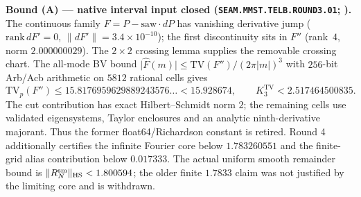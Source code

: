 \documentclass[11pt,a4paper]{article}
\begin{document}
\par\smallskip\noindent\textbf{Bound (A) --- native interval input closed
(\texttt{SEAM.MMST.TELB.ROUND3.01};
).}
The continuous family $F=P-\mathrm{saw}\cdot dP$ has vanishing derivative jump
($\mathrm{rank}\,dF'=0$, $\lVert dF'\rVert=3.4{\times}10^{-10}$); the first
discontinuity sits in $F''$ (rank~$4$, norm $2.000000029$).  The $2{\times}2$
crossing lemma supplies the removable crossing chart.  The all-mode BV bound
$\lvert\hat F(m)\rvert\le\mathrm{TV}(F'')/(2\pi\lvert m\rvert)^3$ with
$256$-bit Arb/Acb arithmetic on $5812$ rational cells gives
\[
 \mathrm{TV}_p(F'')\le15.8176959629889243576\ldots<15.928674,
 \qquad K_3^{\mathrm{TV}}<2.517464500835.
\]
The cut contribution has exact Hilbert--Schmidt norm $2$; the remaining cells use
validated eigensystems, Taylor enclosures and an analytic ninth-derivative majorant.
Thus the former float64/Richardson constant is retired. Round 4 additionally
certifies the infinite Fourier core below $1.783260551$ and the finite-grid
alias contribution below $0.017333$. The actual uniform smooth remainder
bound is $\|R_N^{\rm sm}\|_{\rm HS}<1.800594$; the older finite $1.7833$
claim was not justified by the limiting core and is withdrawn.
\end{document}
